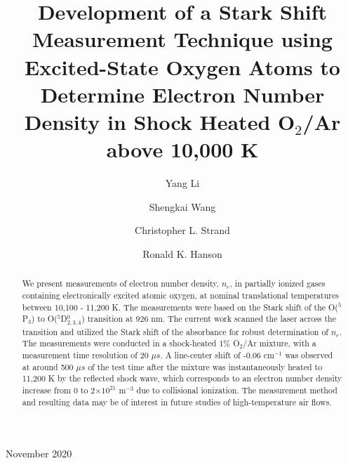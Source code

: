 \documentclass[12pt]{iopart}
\begin{document}
\title[Plasma Sources Science and Technology]{Development of a Stark Shift Measurement Technique using Excited-State Oxygen Atoms to Determine Electron Number Density in Shock Heated O$_2$/Ar above 10,000 K }

\author{Yang Li }
\address{High Temperature Gasdynamics Laboratory, Stanford University}
\author{Shengkai Wang }
\address{State Key Laboratory for Turbulence and Complex Systems, College of Engineering, Peking University, Beijing, 100871, China}
\address{Beijing Innovation Center for Engineering Science and Advanced Technology, Peking University, Beijing, 100871, China}
\author{Christopher L. Strand }
\address{High Temperature Gasdynamics Laboratory, Stanford University}
\author{Ronald K. Hanson }
\address{High Temperature Gasdynamics Laboratory, Stanford University}


\vspace{10pt}
\begin{indented}
\item[]November 2020
\end{indented}

\begin{abstract} 
We present measurements of electron number density, $n_e$, in partially ionized gases containing electronically excited atomic oxygen, at nominal translational temperatures between 10,100 - 11,200 K. The measurements were based on the Stark shift of the O($^5$P$_{3}$) to O($^5$D$_{2,3,4}^0$) transition at 926 nm. The current work scanned the laser across the transition and utilized the Stark shift of the absorbance for robust determination of $n_e$. The measurements were conducted in a shock-heated 1\% O$_2$/Ar mixture, with a measurement time resolution of 20 $\mu s$. A line-center shift of -0.06 cm$^{-1}$ was observed at around 500 $\mu s$ of the test time after the mixture was instantaneously heated to 11,200 K by the reflected shock wave, which corresponds to an electron number density increase from 0 to 2$\times 10^{21}$ m$^{-3}$ due to collisional ionization. The measurement method and resulting data may be of interest in future studies of high-temperature air flows.
\end{abstract}
\end{document}
